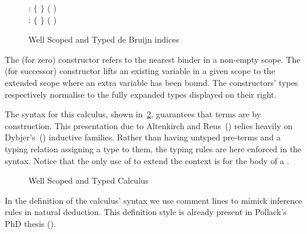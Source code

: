 \begin{figure}[h]
\begin{minipage}{0.5\textwidth}
\end{minipage}
\begin{minipage}{0.5\textwidth}
  \vspace*{\baselineskip}
   : { $\lbrace$ $\rbrace$ 
              ( \AIC{::} )}
  \\
   : { $\lbrace$  $\rbrace$ 
                  ( \AIC{::} )}
\end{minipage}
\caption{Well Scoped and Typed de Bruijn indices\label{fig:variable}}
\end{figure}

The  (for zero) constructor refers to the nearest binder in a non-empty scope.
The  (for successor) constructor lifts an existing variable in a given scope
to the extended scope where an extra variable has been bound. The constructors' types
respectively normalise to the fully expanded types displayed on their right.

The syntax for this calculus, shown in~\cref{fig:term}, guarantees that
terms are \scopeandtypesafe{} by construction. This presentation due to
Altenkirch and Reus~(\citeyear{altenkirch1999monadic}) relies heavily on
Dybjer's~(\citeyear{dybjer1991inductive}) inductive families. Rather than
having untyped pre-terms and a typing relation assigning a type to
them, the typing rules are here enforced in the syntax. Notice that
the only use of  to extend the context is for the body of
a .

\begin{figure}[h]
\caption{Well Scoped and Typed Calculus\label{fig:term}}
\end{figure}

\begin{convention}
In the definition of the calculus' syntax we use comment lines to mimick
inference rules in natural deduction. This definition style is already
present in Pollack's PhD thesis (\citeyear{pollack1994}).
\end{convention}
